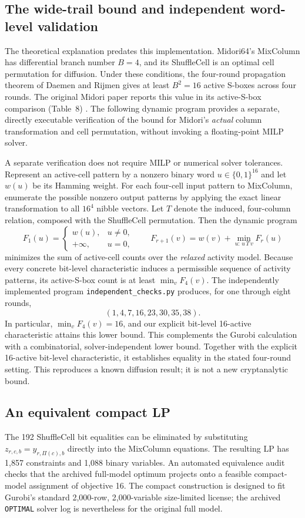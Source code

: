 \documentclass[11pt,a4paper]{article}
\begin{document}
\subsection{The wide-trail bound and independent word-level validation}
The theoretical explanation predates this implementation. Midori64's
MixColumn has differential branch number $B=4$, and its ShuffleCell is an
optimal cell permutation for diffusion. Under these conditions, the
four-round propagation theorem of Daemen and Rijmen
\cite[Ch.~9, Sec.~9.5]{daemen2002} gives at least $B^2=16$ active
S-boxes across four rounds. The original Midori paper reports this value
in its active-S-box comparison (Table~8) \cite{banik2015}.
The following dynamic program provides a separate, directly executable
verification of the bound for Midori's \emph{actual} column transformation
and cell permutation, without invoking a floating-point MILP solver.

A separate verification does not require MILP or numerical solver tolerances.
Represent an active-cell pattern by a nonzero binary word
$u\in\{0,1\}^{16}$ and let $w(u)$ be its Hamming weight. For each
four-cell input pattern to MixColumn, enumerate the possible nonzero output
patterns by applying the exact linear transformation to all $16^4$
nibble vectors. Let $T$ denote the induced, four-column relation, composed
with the ShuffleCell permutation. Then the dynamic program
\[
 F_1(u)=\begin{cases}w(u),&u\ne0,\\+\infty,&u=0,\end{cases}
 \qquad
 F_{r+1}(v)=w(v)+\min_{u:\,u\,T\,v}F_r(u)
\]
minimizes the sum of active-cell counts over the \emph{relaxed} activity model.
Because every concrete bit-level characteristic induces a permissible
sequence of activity patterns, its active-S-box count is at least
$\min_v F_4(v)$. The independently implemented program
\texttt{independent\_checks.py} produces, for one through eight rounds,
\[
 (1,4,7,16,23,30,35,38).
\]
In particular, $\min_v F_4(v)=16$, and our explicit bit-level
16-active characteristic attains this lower bound. This complements the Gurobi calculation with a combinatorial,
solver-independent lower bound. Together with the explicit 16-active
bit-level characteristic, it establishes equality in the stated four-round
setting. This reproduces a known diffusion result; it is not a new
cryptanalytic bound.

\subsection{An equivalent compact LP}
The 192 ShuffleCell bit equalities can be eliminated by substituting
$z_{r,c,b}=y_{r,\Pi(c),b}$ directly into the MixColumn equations.
The resulting LP has 1,857 constraints and 1,088 binary variables. An
automated equivalence audit checks that the archived full-model optimum
projects onto a feasible compact-model assignment of objective 16.
The compact construction is designed to fit Gurobi's standard 2,000-row,
2,000-variable size-limited license; the archived \texttt{OPTIMAL}
solver log is nevertheless for the original full model.
\end{document}
